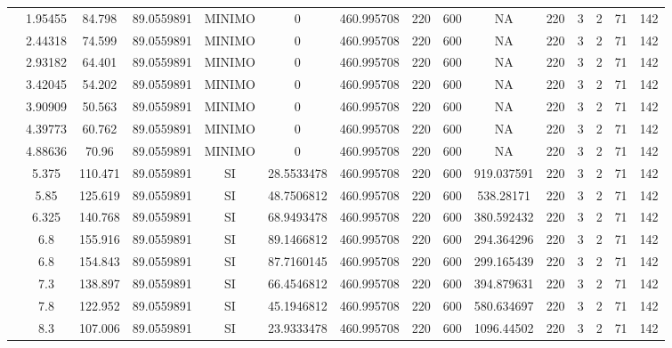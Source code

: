 \begin{table}[H]
{\begin{tabular}{|c|c|c|c|c|c|c|c|c|c|c|c|c|c|c|}
\cline{2-15}    & 1.95455 & 84.798 & 89.0559891 & MINIMO & 0   & 460.995708 & 220 & 600 & NA  & 220 & 3   & 2   & 71  & 142 \bigstrut\\
\cline{2-15}    & 2.44318 & 74.599 & 89.0559891 & MINIMO & 0   & 460.995708 & 220 & 600 & NA  & 220 & 3   & 2   & 71  & 142 \bigstrut\\
\cline{2-15}    & 2.93182 & 64.401 & 89.0559891 & MINIMO & 0   & 460.995708 & 220 & 600 & NA  & 220 & 3   & 2   & 71  & 142 \bigstrut\\
\cline{2-15}    & 3.42045 & 54.202 & 89.0559891 & MINIMO & 0   & 460.995708 & 220 & 600 & NA  & 220 & 3   & 2   & 71  & 142 \bigstrut\\
\cline{2-15}    & 3.90909 & 50.563 & 89.0559891 & MINIMO & 0   & 460.995708 & 220 & 600 & NA  & 220 & 3   & 2   & 71  & 142 \bigstrut\\
\cline{2-15}    & 4.39773 & 60.762 & 89.0559891 & MINIMO & 0   & 460.995708 & 220 & 600 & NA  & 220 & 3   & 2   & 71  & 142 \bigstrut\\
\cline{2-15}    & 4.88636 & 70.96 & 89.0559891 & MINIMO & 0   & 460.995708 & 220 & 600 & NA  & 220 & 3   & 2   & 71  & 142 \bigstrut\\
\cline{2-15}    & 5.375 & 110.471 & 89.0559891 & SI  & 28.5533478 & 460.995708 & 220 & 600 & 919.037591 & 220 & 3   & 2   & 71  & 142 \bigstrut\\
\cline{2-15}    & 5.85 & 125.619 & 89.0559891 & SI  & 48.7506812 & 460.995708 & 220 & 600 & 538.28171 & 220 & 3   & 2   & 71  & 142 \bigstrut\\
\cline{2-15}    & 6.325 & 140.768 & 89.0559891 & SI  & 68.9493478 & 460.995708 & 220 & 600 & 380.592432 & 220 & 3   & 2   & 71  & 142 \bigstrut\\
\cline{2-15}    & 6.8 & 155.916 & 89.0559891 & SI  & 89.1466812 & 460.995708 & 220 & 600 & 294.364296 & 220 & 3   & 2   & 71  & 142 \bigstrut\\
\cline{2-15}    & 6.8 & 154.843 & 89.0559891 & SI  & 87.7160145 & 460.995708 & 220 & 600 & 299.165439 & 220 & 3   & 2   & 71  & 142 \bigstrut\\
\cline{2-15}    & 7.3 & 138.897 & 89.0559891 & SI  & 66.4546812 & 460.995708 & 220 & 600 & 394.879631 & 220 & 3   & 2   & 71  & 142 \bigstrut\\
\cline{2-15}    & 7.8 & 122.952 & 89.0559891 & SI  & 45.1946812 & 460.995708 & 220 & 600 & 580.634697 & 220 & 3   & 2   & 71  & 142 \bigstrut\\
\cline{2-15}    & 8.3 & 107.006 & 89.0559891 & SI  & 23.9333478 & 460.995708 & 220 & 600 & 1096.44502 & 220 & 3   & 2   & 71  & 142 \bigstrut\\

\end{tabular}}
\end{table}
